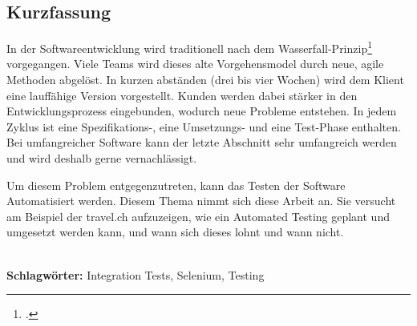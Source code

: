 
\subsection*{Kurzfassung}
In der Softwareentwicklung wird traditionell nach dem Wasserfall-Prinzip\footcite{Wasserfallmodell} vorgegangen. Viele Teams wird dieses alte Vorgehensmodel durch neue, agile Methoden abgelöst. In kurzen abständen (drei bis vier Wochen) wird dem Klient eine lauffähige Version vorgestellt. Kunden werden dabei stärker in den Entwicklungsprozess eingebunden, wodurch neue Probleme entstehen. In jedem Zyklus ist eine Spezifikations-, eine Umsetzungs- und eine Test-Phase enthalten. Bei umfangreicher Software kann der letzte Abschnitt sehr umfangreich werden und wird deshalb gerne vernachlässigt.

Um diesem Problem entgegenzutreten, kann das Testen der Software Automatisiert werden. Diesem Thema nimmt sich diese Arbeit an. Sie versucht am Beispiel der travel.ch aufzuzeigen, wie ein Automated Testing geplant und umgesetzt werden kann, und wann sich dieses lohnt und wann nicht.

%
\mbox{}\\[0.5\baselineskip]\noindent
\textbf{Schlagwörter:} 
Integration Tests, Selenium, Testing
